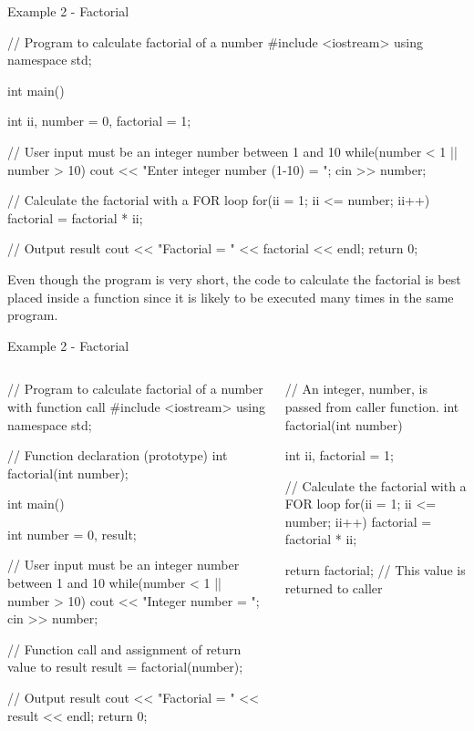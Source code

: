 \documentclass[../lecture4-functions.tex]{subfiles}
\begin{document}

\begin{frame}[fragile]{Example 2 - Factorial}
    \begin{cppcode}[]
// Program to calculate factorial of a number
#include <iostream>
using namespace std;

int main()
{
    int ii, number = 0, factorial = 1;

    // User input must be an integer number between 1 and 10
    while(number < 1 || number > 10)
    {
        cout << "Enter integer number (1-10) = ";
        cin >> number;
    }

    // Calculate the factorial with a FOR loop
    for(ii = 1; ii <= number; ii++)
    {
        factorial = factorial * ii;
    }

    // Output result
    cout << "Factorial = " << factorial << endl;
    return 0;
}
    \end{cppcode}

    Even though the program is very short, the code to calculate the factorial is best placed inside a function since it is likely to be executed many times in the same program.
\end{frame}


\begin{frame}[fragile]{Example 2 - Factorial}
    \begin{columns}[T,onlytextwidth]
            \begin{cppcode}[]
// Program to calculate factorial of a number with function call
#include <iostream>
using namespace std;

// Function declaration (prototype)
int factorial(int number);

int main()
{
    int number = 0, result;

    // User input must be an integer number between 1 and 10
    while(number < 1 || number > 10)
    {
       cout << "Integer number = ";
       cin >> number;
    }

    // Function call and assignment of return value to result
    result = factorial(number);

    // Output result
    cout << "Factorial = " << result << endl;
    return 0;
}
            \end{cppcode}
            \begin{cppcode}[firstnumber = 27]
// An integer, number, is passed from caller function.
int factorial(int number)
{
    int ii, factorial = 1;

    // Calculate the factorial with a FOR loop
    for(ii = 1; ii <= number; ii++)
    {
        factorial = factorial * ii;
    }

    return factorial; // This value is returned to caller
}
            \end{cppcode}
    \end{columns}
\end{frame}
\end{document}
